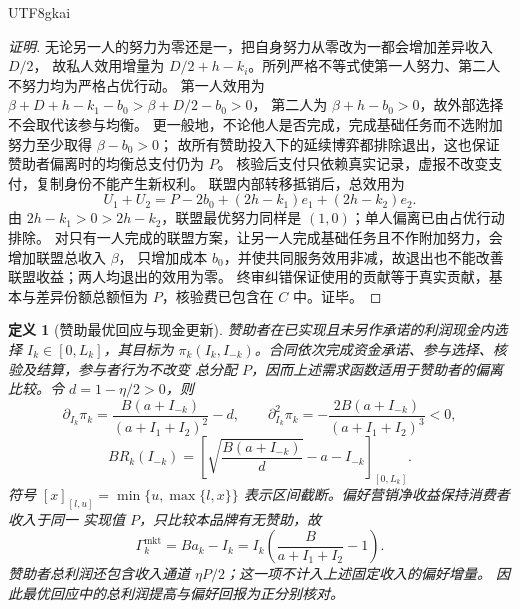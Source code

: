 \documentclass[12pt,a4paper,openany]{report}
\newtheorem{definition}{定义}[chapter]
\begin{document}
\begin{CJK*}{UTF8}{gkai}
\begin{proof}[证明]
无论另一人的努力为零还是一，把自身努力从零改为一都会增加差异收入 \(D/2\)，
故私人效用增量为 \(D/2+h-k_i\)。所列严格不等式使第一人努力、第二人不努力均为严格占优行动。
第一人效用为 \(\beta+D+h-k_1-b_0>\beta+D/2-b_0>0\)，
第二人为 \(\beta+h-b_0>0\)，故外部选择不会取代该参与均衡。
更一般地，不论他人是否完成，完成基础任务而不选附加努力至少取得 \(\beta-b_0>0\)；
故所有赞助投入下的延续博弈都排除退出，这也保证赞助者偏离时的均衡总支付仍为 \(P\)。
核验后支付只依赖真实记录，虚报不改变支付，复制身份不能产生新权利。
联盟内部转移抵销后，总效用为
\[
 U_1+U_2=P-2b_0+(2h-k_1)e_1+(2h-k_2)e_2.
\]
由 \(2h-k_1>0>2h-k_2\)，联盟最优努力同样是 \((1,0)\)；单人偏离已由占优行动排除。
对只有一人完成的联盟方案，让另一人完成基础任务且不作附加努力，会增加联盟总收入 \(\beta\)，
只增加成本 \(b_0\)，并使共同服务效用非减，故退出也不能改善联盟收益；两人均退出的效用为零。
终审纠错保证使用的贡献等于真实贡献，基本与差异份额总额恒为 \(P\)，核验费已包含在 \(C\) 中。证毕。
\end{proof}

\begin{definition}[赞助最优回应与现金更新]
赞助者在已实现且未另作承诺的利润现金内选择 \(I_k\in[0,L_k]\)，其目标为
\(\pi_k(I_k,I_{-k})\)。合同依次完成资金承诺、参与选择、核验及结算，参与者行为不改变
总分配 \(P\)，因而上述需求函数适用于赞助者的偏离比较。令 \(d=1-\eta/2>0\)，则
\[
 \partial_{I_k}\pi_k
   =\frac{B(a+I_{-k})}{(a+I_1+I_2)^2}-d,\qquad
 \partial_{I_k}^2\pi_k
   =-\frac{2B(a+I_{-k})}{(a+I_1+I_2)^3}<0,
\]
\[
 BR_k(I_{-k})=
 \left[\sqrt{\frac{B(a+I_{-k})}{d}}-a-I_{-k}\right]_{[0,L_k]}.
\]
符号 \([x]_{[l,u]}=\min\{u,\max\{l,x\}\}\) 表示区间截断。偏好营销净收益保持消费者收入于同一
实现值 \(P\)，只比较本品牌有无赞助，故
\[
 \Gamma_k^{\mathrm{mkt}}
 =B a_k-I_k
 =I_k\left(\frac{B}{a+I_1+I_2}-1\right).
\]
赞助者总利润还包含收入通道 \(\eta P/2\)；这一项不计入上述固定收入的偏好增量。
因此最优回应中的总利润提高与偏好回报为正分别核对。
\end{definition}


\end{CJK*}
\end{document}
